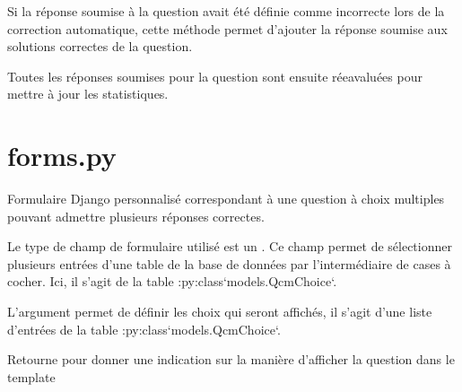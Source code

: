\documentclass[a4,10pt,french]{sphinxmanual}
\begin{document}
\begin{fulllineitems}
\begin{fulllineitems}
\end{fulllineitems}


\begin{fulllineitems}
\label{source:quiz.models.SqSubmit.set_as_correct}
Si la réponse soumise à la question avait été définie comme incorrecte
lors de la correction automatique, cette méthode permet d'ajouter la réponse
soumise aux solutions correctes de la question.

Toutes les réponses soumises pour la question sont ensuite réeavaluées pour
mettre à jour les statistiques.

\end{fulllineitems}


\end{fulllineitems}



\section{forms.py}
\label{source:module-quiz.forms}\label{source:forms-py}

\begin{fulllineitems}
\label{source:quiz.forms.CheckboxForm}
Formulaire Django personnalisé correspondant à une question à choix multiples
pouvant admettre plusieurs réponses correctes.

Le type de champ de formulaire utilisé est un . Ce champ permet
de sélectionner plusieurs entrées d'une table de la base de données par l'intermédiaire
de cases à cocher. Ici, il s'agit
de la table :py:class{}`models.QcmChoice{}`.

L'argument  permet de définir les choix qui seront affichés, il s'agit
d'une liste d'entrées de la table :py:class{}`models.QcmChoice{}`.

\begin{fulllineitems}
\label{source:quiz.forms.CheckboxForm.get_type}
Retourne  pour donner une indication sur la manière d'afficher 
la question dans le template

\end{fulllineitems}


\end{fulllineitems}
\end{document}
